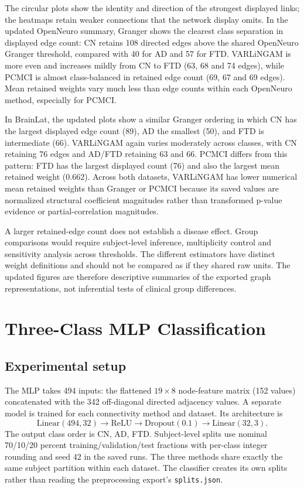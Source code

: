 \documentclass[11pt,a4paper]{article}
\begin{document}

The circular plots show the identity and direction of the strongest displayed
links; the heatmaps retain weaker connections that the network display omits.
In the updated OpenNeuro summary, Granger shows the clearest class separation
in displayed edge count: CN retains 108 directed edges above the shared
OpenNeuro Granger threshold, compared with 40 for AD and 57 for FTD.
VARLiNGAM is more even and increases mildly from CN to FTD (63, 68 and 74
edges), while PCMCI is almost class-balanced in retained edge count (69, 67
and 69 edges). Mean retained weights vary much less than edge counts within
each OpenNeuro method, especially for PCMCI.

In BrainLat, the updated plots show a similar Granger ordering in which CN
has the largest displayed edge count (89), AD the smallest (50), and FTD is
intermediate (66). VARLiNGAM again varies moderately across classes, with CN
retaining 76 edges and AD/FTD retaining 63 and 66. PCMCI differs from this
pattern: FTD has the largest displayed count (76) and also the largest mean
retained weight (0.662). Across both datasets, VARLiNGAM has lower numerical
mean retained weights than Granger or PCMCI because its saved values are
normalized structural coefficient magnitudes rather than transformed p-value
evidence or partial-correlation magnitudes.

A larger retained-edge count does not establish a disease effect. Group
comparisons would require subject-level inference, multiplicity control and
sensitivity analysis across thresholds. The different estimators have distinct
weight definitions and should not be compared as if they shared raw units.
The updated figures are therefore descriptive summaries of the exported graph
representations, not inferential tests of clinical group differences.

\section{Three-Class MLP Classification}

\subsection{Experimental setup}

The MLP takes 494 inputs: the flattened $19\times8$ node-feature matrix
(152 values) concatenated with the 342 off-diagonal directed adjacency values.
A separate model is trained for each connectivity method and dataset.
Its architecture is
\[
\mathrm{Linear}(494,32)\to\mathrm{ReLU}\to\mathrm{Dropout}(0.1)
\to\mathrm{Linear}(32,3).
\]
The output class order is CN, AD, FTD. Subject-level splits use nominal
70/10/20 percent training/validation/test fractions with per-class integer
rounding and seed 42 in the saved runs. The three methods share exactly the
same subject partition within each dataset. The classifier creates its own
splits rather than reading the preprocessing export's \texttt{splits.json}.
\end{document}
